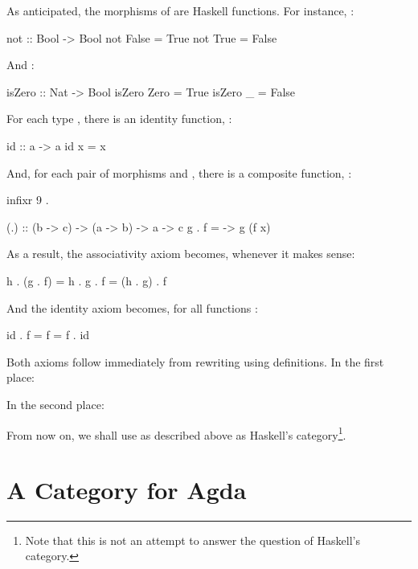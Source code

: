 As anticipated, the morphisms of \hask are Haskell functions. For
instance, :
\begin{codehaskell}
not :: Bool -> Bool
not False = True
not True  = False
\end{codehaskell}
And :
\begin{codehaskell}
isZero :: Nat -> Bool
isZero Zero = True
isZero _    = False
\end{codehaskell}

For each type , there is an identity function,
:
\begin{codehaskell}
id :: a -> a
id x = x
\end{codehaskell}
And, for each pair of morphisms  and
, there is a composite function,
:
\begin{codehaskell}
infixr 9 .

(.) :: (b -> c) -> (a -> b) -> a -> c
g . f = \x -> g (f x)
\end{codehaskell}

As a result, the associativity axiom becomes, whenever it makes sense:
\begin{codehaskell}
h . (g . f) = h . g . f = (h . g) . f
\end{codehaskell}
And the identity axiom becomes, for all functions :
\begin{codehaskell}
id . f = f = f . id
\end{codehaskell}
Both axioms follow immediately from rewriting using definitions. In
the first place:
\begin{steps}
\end{steps}
In the second place:
\begin{steps}
\end{steps}

From now on, we shall use \hask as described above as Haskell's
category\footnote{Note that this is not an attempt to answer the
  question of Haskell's category.}.

\section{A Category for Agda}
\label{sec:category-agda}

